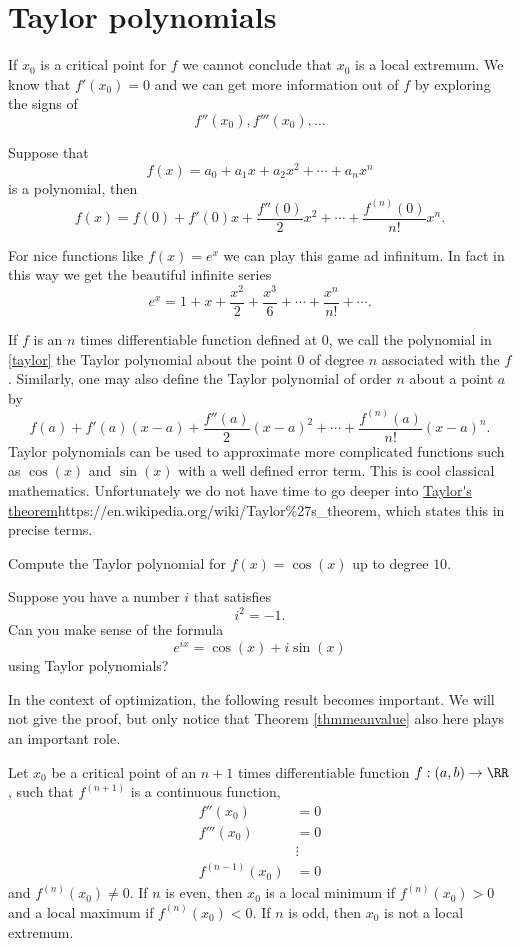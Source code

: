 \documentclass{article}
\begin{document}
\section{Taylor polynomials}\label{section:Taylor}

If $x_0$ is a critical point for $f$ we cannot conclude that $x_0$ is a local extremum. We know
that $f'(x_0)=0$ and we can get more information out of $f$ by exploring the signs of
$$
f''(x_0), f'''(x_0), \dots
$$

Suppose that 
$$
f(x) = a_0 + a_1 x + a_2 x^2 + \cdots + a_n x^n
$$
is a polynomial, then
\begin{equation}\label{taylor}
f(x) = f(0) + f'(0) x + \frac{f''(0)}{2} x^2 + \cdots + \frac{f^{(n)}(0)}{n!} x^n.
\end{equation}

For nice functions like $f(x) = e^x$ we can play this game ad infinitum. In fact in this
way we get the beautiful infinite series
$$
e^x = 1 + x + \frac{x^2}{2} + \frac{x^3}{6} + \cdots + \frac{x^n}{n!} + \cdots.
$$

If $f$ is an $n$ times differentiable function defined at $0$, we call
the polynomial in \eqref{taylor} the Taylor polynomial about the point $0$ of degree $n$ associated
with the $f$. Similarly, one may also define the Taylor polynomial of order $n$ about a point $a$ by
$$
f(a) + f'(a) (x-a) + \frac{f''(a)}{2} (x-a)^2 + \cdots + \frac{f^{(n)}(a)}{n!} (x-a)^n.
$$
Taylor polynomials can be used to approximate more complicated functions such as
$\cos(x)$ and $\sin (x)$ with a well defined error term. This is cool classical
mathematics. Unfortunately we do not have time to go deeper into
\url{Taylor's theorem}{https://en.wikipedia.org/wiki/Taylor\%27s_theorem}, which states this
in precise terms.

\beginshex
Compute the Taylor polynomial for $f(x) = \cos(x)$ up to degree $10$.
\endshex

\beginshex
Suppose you have a number $i$ that satisfies
$$
i^2 = -1.
$$
Can you make sense of the formula
$$
e^{i x} = \cos(x) + i \sin(x)
$$
using Taylor polynomials?
\endshex


In the context of optimization, the following
result becomes important. We will not give the proof, but only notice that Theorem
\ref{thmmeanvalue} also here plays an important role.

\begin{theorem}[emph]\label{derconv}
  Let $x_0$ be a critical point of an $n+1$ times differentiable
  function $f:(a, b)\rightarrow \RR$, such that $f^{(n+1)}$
  is a continuous function,
  \begin{align*}
    f''(x_0) &= 0\\
    f'''(x_0) &= 0\\
&\vdots\\
   f^{(n-1)}(x_0) &= 0
  \end{align*}
  and $f^{(n)}(x_0)\neq 0$. If $n$ is even, then $x_0$ is a local
  minimum if $f^{(n)}(x_0) > 0$ and a local maximum if
  $f^{(n)}(x_0)<0$. If $n$ is odd, then $x_0$ is not a local extremum.
\end{theorem}
\end{document}

